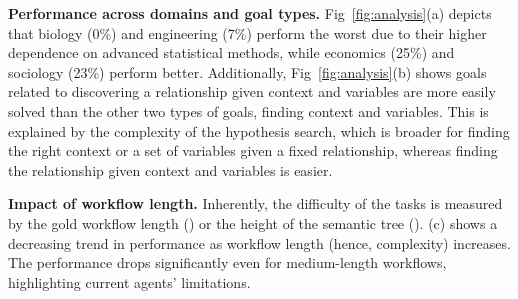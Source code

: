     
    
    

\textbf{Performance across domains and goal types.} Fig~\ref{fig:analysis}(a) depicts that biology (0\%) and engineering (7\%) perform the worst due to their higher dependence on advanced statistical methods, while economics (25\%) and sociology (23\%) perform better. Additionally, Fig~\ref{fig:analysis}(b) shows goals related to discovering a relationship given context and variables are more easily solved than the other two types of goals, finding context and variables. This is explained by the complexity of the hypothesis search, which is broader for finding the right context or a set of variables given a fixed relationship, whereas finding the relationship given context and variables is easier.

\textbf{Impact of workflow length.}
Inherently, the difficulty of the tasks is measured by the gold workflow length (\real{}) or the height of the semantic tree (\synth{}). (c) shows a decreasing trend in performance as workflow length (hence, complexity) increases. The performance drops significantly even for medium-length workflows, highlighting current agents' limitations.  



